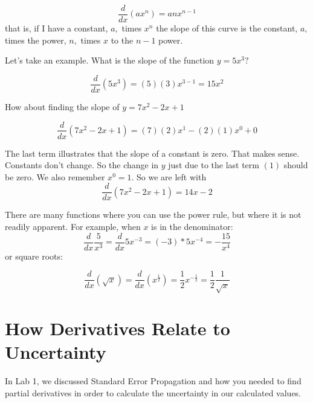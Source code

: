 \documentclass[twoside,11pt,ShortChapTitles]{BYUTextbook}
\begin{document}
\[
\frac{d}{dx}\left(  ax^{n}\right)  =anx^{n-1}
\]
that is, if I have a constant, $a,$ times $x^{n}$ the slope of this curve is
the constant, $a,$ times the power, $n,$ times $x$ to the $n-1$ power.

Let's take an example. What is the slope of the function $y=5x^{3}?$

\[
\frac{d}{dx}\left(  5x^{3}\right)  =\left(  5\right)  \left(  3\right)
x^{3-1}=15x^{2}
\]


How about finding the slope of $y=7x^{2}-2x+1$

\[
\frac{d}{dx}\left(  7x^{2}-2x+1\right)  =\left(  7\right)  \left(  2\right)
x^{1}-\left(  2\right)  (1)x^{0}+0
\]

The last term illustrates that the slope of a constant is zero. That makes
sense. Constants don't change. So the change in $y$ just due to the last term
$(1)$ should be zero. We also remember $x^{0}=1.$ So we are left with
\[
\frac{d}{dx}\left(  7x^{2}-2x+1\right)  =14x-2
\]


There are many functions where you can use the power rule, but where it is not readily apparent.  For example, when $x$ is in the denominator:
\[ \frac{d}{dx}\frac{5}{x^3} = \frac{d}{dx} 5x^{-3} = (-3)*5x^{-4} = -\frac{15}{x^4}\]
or square roots:

\[
\frac{d}{dx}\left(  \sqrt{x}\right)  =\frac{d}{dx}\left(x^{\frac{1}{2}}\right)  =\frac{1}{2}x^{-\frac{1}{2}} = \frac{1}{2}\frac{1}{\sqrt{x}}
\]


\section{How Derivatives Relate to Uncertainty}
In Lab 1, we discussed Standard Error Propagation and how you needed to find partial derivatives in order to calculate the uncertainty in our calculated values.
\end{document}
